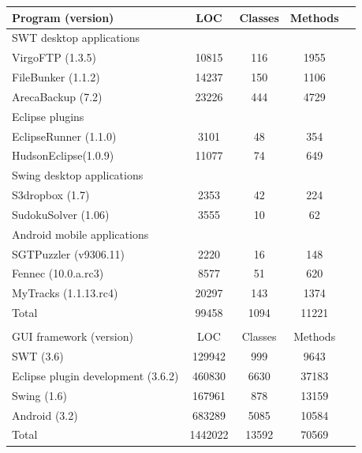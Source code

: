 \begin{table}[t]
\begin{center}
 \fontsize{9pt}{\baselineskip}\selectfont
\hspace*{-0.2cm}
\setlength{\tabcolsep}{.70\tabcolsep}
\begin{tabular}{|p{4.4cm}||c|c|c|c|}
\hline
 Program (version) & LOC & Classes & Methods \\
\hline \hline
\multicolumn{4}{|l|}{SWT desktop applications}   \\
 \hline
 VirgoFTP (1.3.5) &  10815 &  116 &  1955\\
 \hline
 FileBunker (1.1.2)&  14237 &  150 &  1106  \\
 \hline
 ArecaBackup (7.2)&   23226 &  444 &  4729 \\
 \hline
 \hline
\multicolumn{4}{|l|}{Eclipse plugins}   \\
 \hline
 EclipseRunner (1.1.0) &  3101 &  48 &  354\\
 \hline
 HudsonEclipse(1.0.9)&  11077 &  74 &  649 \\
 \hline
 \hline
\multicolumn{4}{|l|}{Swing desktop applications}   \\
 \hline
 S3dropbox (1.7) &  2353 &  42  &  224 \\
 \hline
 SudokuSolver (1.06)&  3555 &  10 &  62 \\
 \hline
 \hline
\multicolumn{4}{|l|}{Android mobile applications}   \\
 \hline
 SGTPuzzler (v9306.11)&  2220 &  16 &  148 \\
 \hline
 Fennec (10.0.a.rc3)&  8577 &  51 &  620 \\
 \hline
 MyTracks (1.1.13.rc4)&  20297 &  143 &  1374 \\
\hline
\hline
 Total &  99458 &  1094 &  11221 \\
\hline
\multicolumn{4}{l}{}   \\
\hline
 GUI framework (version) & LOC & Classes & Methods  \\
\hline \hline
 SWT (3.6)&  129942 &  999 &  9643 \\
\hline
 Eclipse plugin development (3.6.2)&  460830 &  6630 &  37183 \\
\hline
Swing (1.6)&  167961 &  878 &  13159 \\
\hline
 Android (3.2)&  683289 &  5085 &  10584 \\
\hline
\hline
 Total &  1442022 &  13592 &  70569\\
\hline
\end{tabular}

\end{center}
\vspace{-15pt}
\end{table}

